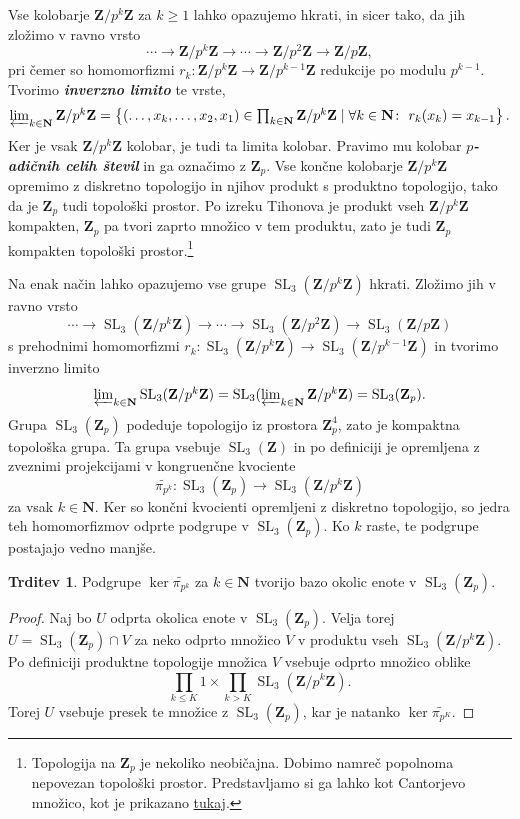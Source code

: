 \documentclass[11pt]{book}
\def\NN{\mathbf{N}}
\def\ZZ{\mathbf{Z}}
\DeclareMathOperator\SL{SL}
\def\definicija{\color{rdeca}\bf\em}
\theoremstyle{definition}
\theoremstyle{zgled}
\theoremstyle{odprtproblem}
\theoremstyle{domacanaloga}
\newenvironment{dokaz}
    {\color{siva}\begin{proof}}
    {\end{proof}}
\theoremstyle{izrek}
\newtheorem*{trditev}{Trditev}
\begin{document}
Vse kolobarje $\ZZ/p^k\ZZ$ za $k \geq 1$ lahko opazujemo hkrati, in sicer tako, da jih zložimo v ravno vrsto
\[
    \cdots \to \ZZ/p^k\ZZ \to \cdots \to \ZZ/p^2\ZZ \to \ZZ/p\ZZ,
\]
pri čemer so homomorfizmi $r_k \colon \ZZ/p^k\ZZ \to \ZZ/p^{k-1}\ZZ$ redukcije po modulu $p^{k-1}$. Tvorimo {\definicija inverzno limito} te vrste,
\[
    \textstyle \varprojlim_{k \in \NN} \ZZ/p^k\ZZ
    = \left\{
        (\dots, x_k, \dots, x_2, x_1) \in \prod_{k \in \NN} \ZZ/p^k\ZZ \mid
        \forall k \in \NN \colon \ r_k(x_k) = x_{k-1}
    \right\}.
\]
Ker je vsak $\ZZ/p^k\ZZ$ kolobar, je tudi ta limita kolobar. Pravimo mu kolobar {\definicija $p$-adičnih celih števil} in ga označimo z $\ZZ_p$. Vse končne kolobarje $\ZZ/p^k\ZZ$ opremimo z diskretno topologijo in njihov produkt s produktno topologijo, tako da je $\ZZ_p$ tudi topološki prostor. Po izreku Tihonova je produkt vseh $\ZZ/p^k\ZZ$ kompakten, $\ZZ_p$ pa tvori zaprto množico v tem produktu, zato je tudi $\ZZ_p$ kompakten topološki prostor.\footnote{Topologija na $\ZZ_p$ je nekoliko neobičajna. Dobimo namreč popolnoma nepovezan topološki prostor. Predstavljamo si ga lahko kot Cantorjevo množico, kot je prikazano \href{http://roice3.org/padics/}{tukaj}.}

Na enak način lahko opazujemo vse grupe $\SL_3(\ZZ/p^k\ZZ)$ hkrati. Zložimo jih v ravno vrsto
\[
    \textstyle \cdots \to \SL_3(\ZZ/p^k\ZZ) \to \cdots \to \SL_3(\ZZ/p^2\ZZ) \to \SL_3(\ZZ/p\ZZ)
\]
s prehodnimi homomorfizmi $r_k \colon \SL_3(\ZZ/p^k\ZZ) \to \SL_3(\ZZ/p^{k-1}\ZZ)$ in tvorimo inverzno limito
\[
    \textstyle \varprojlim_{k \in \NN} \SL_3(\ZZ/p^k\ZZ)
    = \SL_3(\varprojlim_{k \in \NN} \ZZ/p^k\ZZ)
    = \SL_3(\ZZ_p).
\]
Grupa $\SL_3(\ZZ_p)$ podeduje topologijo iz prostora $\ZZ_p^4$, zato je kompaktna topološka grupa. Ta grupa vsebuje $\SL_3(\ZZ)$ in po definiciji je opremljena z zveznimi projekcijami v kongruenčne kvociente 
\[
    \textstyle \widetilde{\pi_{p^k}} \colon \SL_3(\ZZ_p) \to \SL_3(\ZZ/p^k\ZZ)
\]
za vsak $k \in \NN$. Ker so končni kvocienti opremljeni z diskretno topologijo, so jedra teh homomorfizmov odprte podgrupe v $\SL_3(\ZZ_p)$. Ko $k$ raste, te podgrupe postajajo vedno manjše.

\begin{trditev}
Podgrupe $\ker \widetilde{\pi_{p^k}}$ za $k \in \NN$ tvorijo bazo okolic enote v $\SL_3(\ZZ_p)$.
\end{trditev}
\begin{dokaz}
Naj bo $U$ odprta okolica enote v $\SL_3(\ZZ_p)$. Velja torej $U = \SL_3(\ZZ_p) \cap V$ za neko odprto množico $V$ v produktu vseh $\SL_3(\ZZ/p^k\ZZ)$. Po definiciji produktne topologije množica $V$ vsebuje odprto množico oblike
\[
    \prod_{k \leq K} 1 \times \prod_{k > K} {\textstyle \SL_3(\ZZ/p^k\ZZ)}.
\]
Torej $U$ vsebuje presek te množice z $\SL_3(\ZZ_p)$, kar je natanko $\ker \widetilde{\pi_{p^K}}$.
\end{dokaz}
\end{document}
